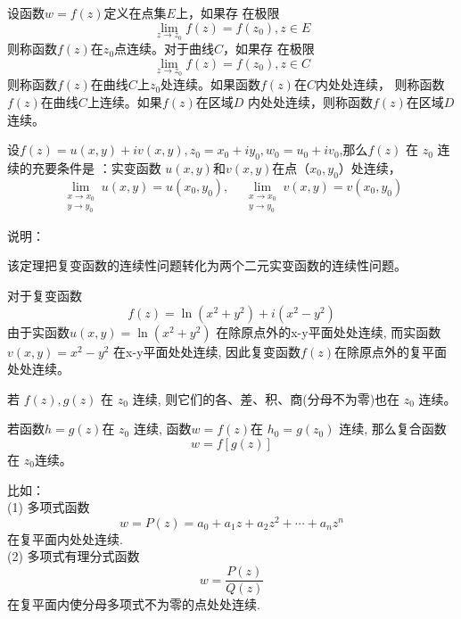 \begin{definition}
    \label{}\index{}
    设函数$w = f(z)$定义在点集$E$上，如果存
    在极限\[ \lim_{z \to z_0} f(z) = f(z_0), z \in E\] 
    则称函数$f(z)$在$z_0$点连续。对于曲线$C$，如果存
    在极限\[ \lim_{z \to z_0} f(z) = f(z_0), z \in C\]
    则称函数$f(z)$在曲线$C$上$z_0$处连续。如果函数$f(z)$在$C$内处处连续， 则称函数$f(z)$在曲线$C$上连续。如果$f(z)$在区域$D$ 内处处连续，则称函数$f(z)$在区域$D$连续。
\end{definition}

\begin{theorem}\label{} \index{}
设$f(z) = u(x,y) + i v(x,y), z_0 = x_0 + i y_0, w_0 = u_0 + i v_0 $,那么$ f(z) $ 在 $z_0$ 连续的充要条件是 ：实变函数 $u(x,y)$和$v(x,y) $在点（$x_0, y_0$）处连续，
  \[ \lim _{\substack{x \rightarrow x_{0} \\ y \rightarrow y_{0}}} u(x, y)=u(x_0, y_0), \quad \lim _{\substack{x \rightarrow x_{0} \\ y \rightarrow y_{0}}} v(x, y)=v(x_0, y_0)\]
\end{theorem}
说明：\begin{compactitem}
    \item 该定理把复变函数的连续性问题转化为两个二元实变函数的连续性问题。
\end{compactitem}
对于复变函数$$f(z) = \ln (x^2 + y^2) + i (x^2 -y^2)$$
由于实函数$u(x,y) = \ln (x^2 + y^2) $ 在除原点外的x-y平面处处连续,
而实函数$v(x,y) = x^2 -y^2 $ 在x-y平面处处连续,
因此复变函数$f(z)$在除原点外的复平面处处连续。

\begin{theorem}\label{} \index{}
 若 $f(z), g(z)$ 在 $z_0$ 连续, 则它们的各、差、积、商(分母不为零)也在 $z_0$ 连续。
\end{theorem}

\begin{theorem}\label{} \index{}
若函数$h = g(z)$在 $z_0$ 连续,  函数$w = f(z)$在 $h_0 = g(z_0)$ 连续, 那么复合函数 
        \[ w = f[g(z)]\]
        在 $z_0$连续。  
\end{theorem}
比如：\\
(1) 多项式函数  
\[ w = P(z) = a_0 + a_1 z + a_2 z^2 + \cdots + a_n z^n\]
在复平面内处处连续. \\
(2) 多项式有理分式函数
\[ w = \frac{ P(z) }{ Q(z) } \]
在复平面内使分母多项式不为零的点处处连续.

